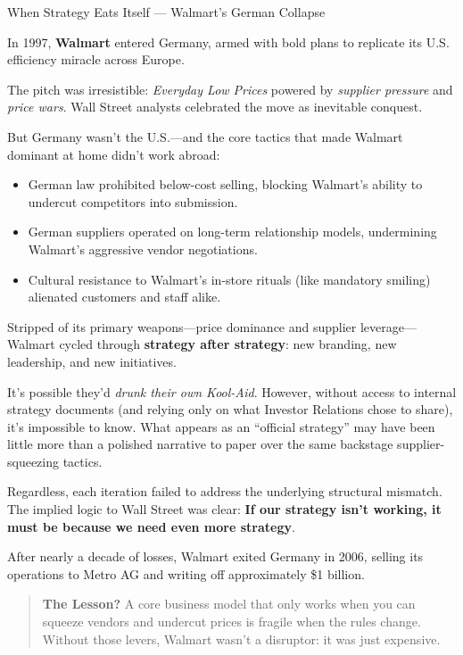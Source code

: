 \medskip

\begin{HistoricalSidebar}{When Strategy Eats Itself --- Walmart's German Collapse}

In 1997, \textbf{Walmart} entered Germany, armed with bold plans to replicate its U.S. efficiency miracle across Europe.

\medskip

The pitch was irresistible: \textit{Everyday Low Prices} powered by \textit{supplier pressure} and \textit{price wars}. Wall Street analysts celebrated the move as inevitable conquest.

\medskip

But Germany wasn’t the U.S.—and the core tactics that made Walmart dominant at home didn’t work abroad:
\begin{itemize}
    \item German law prohibited below-cost selling, blocking Walmart’s ability to undercut competitors into submission.
    \item German suppliers operated on long-term relationship models, undermining Walmart’s aggressive vendor negotiations.
    \item Cultural resistance to Walmart’s in-store rituals (like mandatory smiling) alienated customers and staff alike.
\end{itemize}

\medskip

Stripped of its primary weapons—price dominance and supplier leverage—Walmart cycled through \textbf{strategy after strategy}: 
new branding, new leadership, and new initiatives.  

\medskip

It’s possible they’d \emph{drunk their own Kool-Aid}. However, without access to internal strategy documents (and relying only on what Investor Relations chose to share), it’s impossible 
to know.  What appears as an “official strategy” may have been little more than a polished narrative to paper over 
the same backstage supplier-squeezing tactics.  

\medskip

Regardless, each iteration failed to address the underlying structural mismatch.  The implied logic to Wall Street was 
clear: \textbf{If our strategy isn’t working, it must be because we need even more strategy}.

\medskip

After nearly a decade of losses, Walmart exited Germany in 2006, selling its operations to Metro AG and writing off 
approximately \$1 billion.

\medskip

\begin{quote}
  \textbf{The Lesson?} A core business model that only works when you can squeeze vendors and undercut prices is fragile when 
  the rules change. Without those levers, Walmart wasn’t a disruptor: it was just expensive.
\end{quote}

\end{HistoricalSidebar}

